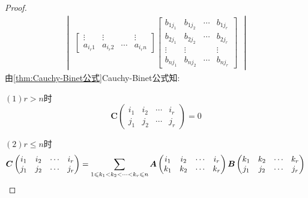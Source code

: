 {\begin{proof}
\begin{align*}
\begin{vmatrix}
\begin{bmatrix}
                    \vdots   & \vdots   &        & \vdots   \\
                    a_{i_r1} & a_{i_r2} & \cdots & a_{i_rn}
                \end{bmatrix}
                                    \begin{bmatrix}
                    b_{1j_1} & b_{1j_2} & \cdots & b_{1j_r} \\
                    b_{2j_1} & b_{2j_2} & \cdots & b_{2j_r} \\
                    \vdots   & \vdots   &        & \vdots   \\
                    b_{nj_1} & b_{nj_2} & \cdots & b_{nj_r}
                \end{bmatrix}
                                \end{vmatrix}
        \end{align*}
        由\cref{thm:Cauchy-Binet公式}Cauchy-Binet公式知:

        $(1)r > n$时
        \[
            \bm{C}\begin{pmatrix}
                i_1 & i_2 & \cdots & i_r \\
                j_1 & j_2 & \cdots & j_r
            \end{pmatrix}=0
        \]

        $(2)r\leqslant n$时
        \[
            \bm{C}\begin{pmatrix}
                i_1 & i_2 & \cdots & i_r \\
                j_1 & j_2 & \cdots & j_r
            \end{pmatrix}=
            \sum_{1\leqslant k_1<k_2<\cdots<k_r\leqslant n}\bm{A}\begin{pmatrix}
                i_1 & i_2 & \cdots & i_r \\
                k_1 & k_2 & \cdots & k_r
            \end{pmatrix}\bm{B}\begin{pmatrix}
                k_1 & k_2 & \cdots & k_r \\
                j_1 & j_2 & \cdots & j_r
            \end{pmatrix}\qedhere
        \]
    \end{proof}
}
